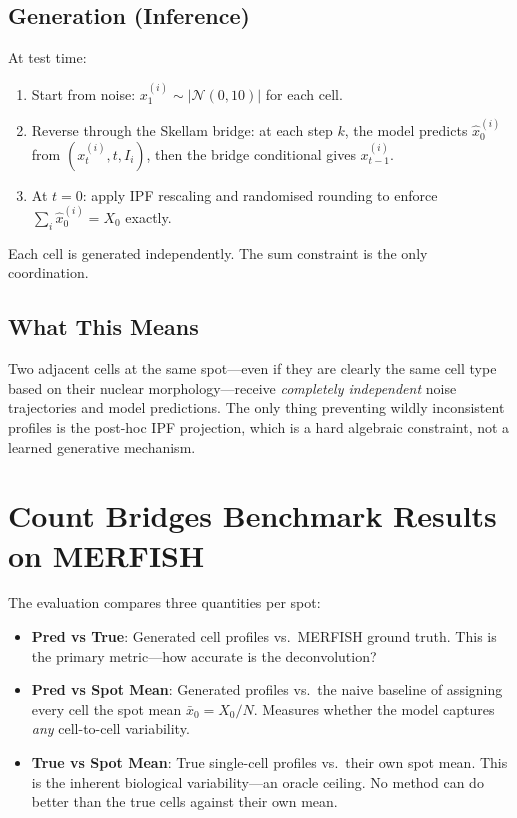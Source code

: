 \documentclass[11pt]{article}
\begin{document}
\subsection{Generation (Inference)}

At test time:
\begin{enumerate}
  \item Start from noise: $x_1^{(i)} \sim |\mathcal{N}(0, 10)|$ for each cell.
  \item Reverse through the Skellam bridge: at each step $k$, the model predicts $\hat{x}_0^{(i)}$ from $(x_t^{(i)}, t, I_i)$, then the bridge conditional gives $x_{t-1}^{(i)}$.
  \item At $t = 0$: apply IPF rescaling and randomised rounding to enforce $\sum_i \hat{x}_0^{(i)} = X_0$ exactly.
\end{enumerate}

Each cell is generated independently. The sum constraint is the only coordination.

\subsection{What This Means}

Two adjacent cells at the same spot---even if they are clearly the same cell type based on their nuclear morphology---receive \emph{completely independent} noise trajectories and model predictions. The only thing preventing wildly inconsistent profiles is the post-hoc IPF projection, which is a hard algebraic constraint, not a learned generative mechanism.

\section{Count Bridges Benchmark Results on MERFISH}

The evaluation compares three quantities per spot:
\begin{itemize}
  \item \textbf{Pred vs True}: Generated cell profiles vs.\ MERFISH ground truth. This is the primary metric---how accurate is the deconvolution?
  \item \textbf{Pred vs Spot Mean}: Generated profiles vs.\ the naive baseline of assigning every cell the spot mean $\bar{x}_0 = X_0 / N$. Measures whether the model captures \emph{any} cell-to-cell variability.
  \item \textbf{True vs Spot Mean}: True single-cell profiles vs.\ their own spot mean. This is the inherent biological variability---an oracle ceiling. No method can do better than the true cells against their own mean.
\end{itemize}
\end{document}
